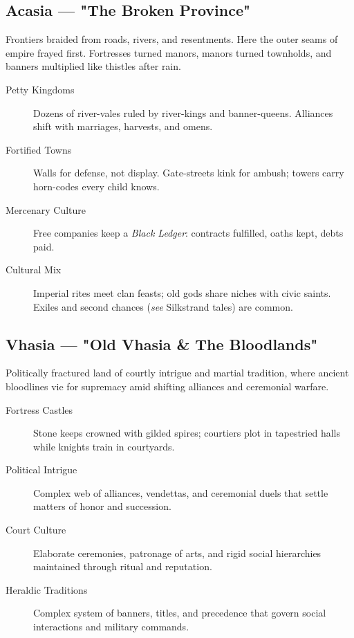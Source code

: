 \subsection*{Acasia — "The Broken Province"}

Frontiers braided from roads, rivers, and resentments. Here the outer seams of empire frayed first. Fortresses turned manors, manors turned townholds, and banners multiplied like thistles after rain.

\begin{description}
\item[Petty Kingdoms] Dozens of river-vales ruled by river-kings and banner-queens. Alliances shift with marriages, harvests, and omens.
\item[Fortified Towns] Walls for defense, not display. Gate-streets kink for ambush; towers carry horn-codes every child knows.
\item[Mercenary Culture] Free companies keep a \emph{Black Ledger}: contracts fulfilled, oaths kept, debts paid.
\item[Cultural Mix] Imperial rites meet clan feasts; old gods share niches with civic saints. Exiles and second chances (\emph{see} Silkstrand tales) are common.
\end{description}

\subsection*{Vhasia — "Old Vhasia \& The Bloodlands"}

Politically fractured land of courtly intrigue and martial tradition, where ancient bloodlines vie for supremacy amid shifting alliances and ceremonial warfare.

\begin{description}
\item[Fortress Castles] Stone keeps crowned with gilded spires; courtiers plot in tapestried halls while knights train in courtyards.
\item[Political Intrigue] Complex web of alliances, vendettas, and ceremonial duels that settle matters of honor and succession.
\item[Court Culture] Elaborate ceremonies, patronage of arts, and rigid social hierarchies maintained through ritual and reputation.
\item[Heraldic Traditions] Complex system of banners, titles, and precedence that govern social interactions and military commands.
\end{description}

